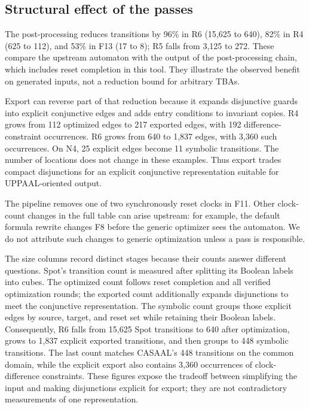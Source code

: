 \documentclass{ieeeaccess}
\begin{document}
\subsection{Structural effect of the passes}
The post-processing reduces transitions by 96\% in R6 (15,625 to 640), 82\% in R4 (625 to 112), and 53\% in F13 (17 to 8); R5 falls from 3,125 to 272. These compare the upstream automaton with the output of the post-processing chain, which includes reset completion in this tool. They illustrate the observed benefit on generated inputs, not a reduction bound for arbitrary TBAs.

Export can reverse part of that reduction because it expands disjunctive guards into explicit conjunctive edges and adds entry conditions to invariant copies. R4 grows from 112 optimized edges to 217 exported edges, with 192 difference-constraint occurrences. R6 grows from 640 to 1,837 edges, with 3,360 such occurrences. On N4, 25 explicit edges become 11 symbolic transitions. The number of locations does not change in these examples. Thus export trades compact disjunctions for an explicit conjunctive representation suitable for UPPAAL-oriented output.

The pipeline removes one of two synchronously reset clocks in F11. Other clock-count changes in the full table can arise upstream: for example, the default formula rewrite changes F8 before the generic optimizer sees the automaton. We do not attribute such changes to generic optimization unless a pass is responsible.

The size columns record distinct stages because their counts answer different
questions. Spot's transition count is measured after splitting its Boolean
labels into cubes. The optimized count follows reset completion and all
verified optimization rounds; the exported count additionally expands
disjunctions to meet the conjunctive representation. The symbolic count
groups those explicit edges by source, target, and reset set while retaining
their Boolean labels. Consequently, R6 falls from 15,625 Spot transitions to
640 after optimization, grows to 1,837 explicit exported transitions, and
then groups to 448 symbolic transitions. The last count matches CASAAL's
448 transitions on the common domain, while the explicit export also contains
3,360 occurrences of clock-difference constraints. These figures expose the
tradeoff between simplifying the input and making disjunctions explicit for
export; they are not contradictory measurements of one representation.
\end{document}

